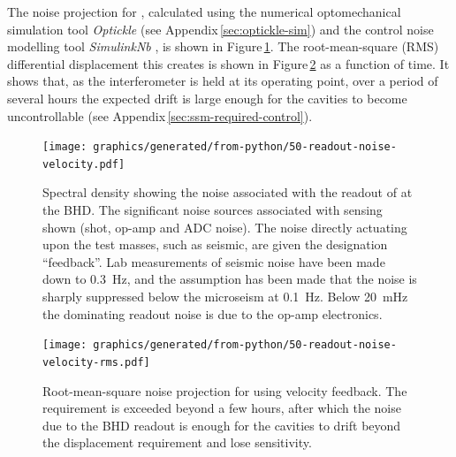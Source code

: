 The noise projection for \LMINUS{}, calculated using the numerical optomechanical simulation tool \emph{Optickle} \cite{Evans2012} (see Appendix\,\ref{sec:optickle-sim}) and the control noise modelling tool \emph{SimulinkNb} \cite{SimulinkNb}, is shown in Figure\,\ref{fig:readout-noise-velocity}. The root-mean-square (\gls{RMS}) differential displacement this creates is shown in Figure\,\ref{fig:readout-noise-velocity-rms} as a function of time. It shows that, as the interferometer is held at its operating point, over a period of several hours the expected drift is large enough for the cavities to become uncontrollable (see Appendix\,\ref{sec:ssm-required-control}).

\begin{figure}
  \centering
  \texttt{[image: graphics/generated/from-python/50-readout-noise-velocity.pdf]}
  \caption[Noise projection for \LMINUS{} using velocity feedback]{\label{fig:readout-noise-velocity}Spectral density showing the noise associated with the readout of \LMINUS{} at the BHD. The significant noise sources associated with sensing shown (shot, op-amp and ADC noise). The noise directly actuating upon the test masses, such as seismic, are given the designation ``feedback''. Lab measurements of seismic noise have been made down to \SI{0.3}{\hertz}, and the assumption has been made that the noise is sharply suppressed below the microseism at \SI{0.1}{\hertz}. Below \SI{20}{\milli\hertz} the dominating readout noise is due to the op-amp electronics.}
\end{figure}

\begin{figure}
  \centering
  \texttt{[image: graphics/generated/from-python/50-readout-noise-velocity-rms.pdf]}
  \caption[Root-mean-square noise projection for \LMINUS{} using velocity feedback]{\label{fig:readout-noise-velocity-rms}Root-mean-square noise projection for \LMINUS{} using velocity feedback. The requirement is exceeded beyond a few hours, after which the noise due to the BHD readout is enough for the cavities to drift beyond the displacement requirement and lose sensitivity.}
\end{figure}

